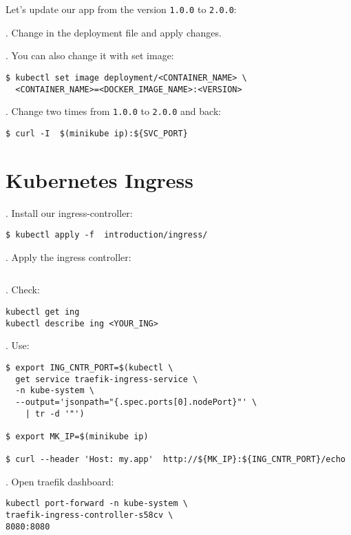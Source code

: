\documentclass[12pt, letterpaper]{article}
\begin{document}
Let's update our app from the version \verb|1.0.0| to \verb|2.0.0|:

. Change in the deployment file and apply changes.

. You can also change it with set image:

\begin{verbatim}
$ kubectl set image deployment/<CONTAINER_NAME> \
  <CONTAINER_NAME>=<DOCKER_IMAGE_NAME>:<VERSION>
\end{verbatim}

. Change two times from \verb|1.0.0| to \verb|2.0.0| and back:

\begin{verbatim}
$ curl -I  $(minikube ip):${SVC_PORT}
\end{verbatim}

%
%
%
\pagebreak
\section{Kubernetes Ingress}

. Install our ingress-controller:

\begin{verbatim}
$ kubectl apply -f  introduction/ingress/
\end{verbatim}

. Apply the ingress controller:
\inputminted{yaml}{introduction/kube-ingress.yaml}

. Check:

\begin{verbatim}
kubectl get ing
kubectl describe ing <YOUR_ING>
\end{verbatim}

. Use:

\begin{verbatim}
$ export ING_CNTR_PORT=$(kubectl \
  get service traefik-ingress-service \
  -n kube-system \
  --output='jsonpath="{.spec.ports[0].nodePort}"' \
    | tr -d '"')

$ export MK_IP=$(minikube ip)

$ curl --header 'Host: my.app'  http://${MK_IP}:${ING_CNTR_PORT}/echo

\end{verbatim}

\bigskip
5. Open traefik dashboard:

\begin{verbatim}
kubectl port-forward -n kube-system \
traefik-ingress-controller-s58cv \
8080:8080
\end{verbatim}
\end{document}
